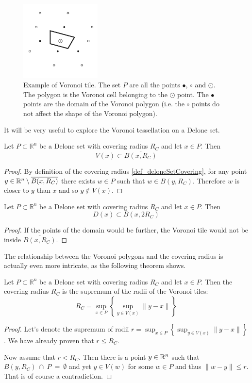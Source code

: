 \documentclass[text.tex]{subfiles}
\begin{document}
\begin{figure}[h]
\centering
\includegraphics[width=0.36\textwidth]{img/preliminaries/voronoi}
\caption{Example of Voronoi tile. The set $P$ are all the points $\bullet$, $\circ$ and $\odot$. The polygon is the Voronoi cell belonging to the $\odot$ point. The $\bullet$ points are the domain of the Voronoi polygon (i.e. the $\circ$ points do not affect the shape of the Voronoi polygon).}
\label{fig_voronoiExample}
\end{figure}

It will be very useful to explore the Voronoi tessellation on a Delone set. 

\begin{theorem}
Let $P\subset \mathbb{R}^n$ be a Delone set with covering radius $R_C$ and let $x\in P$. Then 
$$V(x)\subset \overline{B(x,R_C)}$$
\end{theorem}
\begin{proof}
By definition of the covering radius \ref{def_deloneSetCovering}, for any point $y\in \mathbb{R}^n\setminus \overline{B(x,R_C)}$ there exists $w\in P$ such that $w\in B(y,R_C)$. Therefore $w$ is closer to $y$ than $x$ and so $y\not\in V(x)$.
\end{proof}

\begin{theorem}
Let $P\subset \mathbb{R}^n$ be a Delone set with covering radius $R_C$ and let $x\in P$. Then 
$$D(x)\subset B(x,2R_C)$$
\end{theorem}
\begin{proof}
If the points of the domain would be further, the Voronoi tile would not be inside $\overline{B(x,R_C)}$. 
\end{proof}

The relationship between the Voronoi polygons and the covering radius is actually even more intricate, as the following theorem shows. 

\begin{theorem}
Let $P\subset \mathbb{R}^n$ be a Delone set with covering radius $R_C$ and let $x\in P$. Then the covering radius $R_C$ is the supremum of the radii of the Voronoi tiles:  
$$R_C = \sup_{x\in P}\left\{\sup_{y\in V(x)}\lVert y-x\rVert\right\}$$
\end{theorem}
\begin{proof}
Let's denote the supremum of radii $r= \sup_{x\in P}\left\{\sup_{y\in V(x)}\lVert y-x\rVert\right\}$. We have already proven that $r\leq R_C$.

Now assume that $r<R_C$. Then there is a point $y\in\mathbb{R}^n$ such that $B(y,R_C)~\cap~P~=~\emptyset$ and yet $y\in V(w)$ for some $w\in P$ and thus $\lVert w -y \rVert\leq r$. That is of course a contradiction. 
\end{proof}
\end{document}
